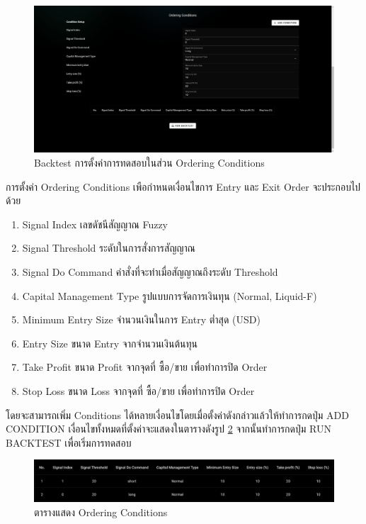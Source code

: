 \begin{figure}[ht]
    \centering
    \includegraphics[width=\textwidth]{images/web-tuts/backtest-setup-order-conds.PNG}
    \caption{Backtest การตั้งค่าการทดสอบในส่วน Ordering Conditions}
    \label{fig:backtest-setup-order-conds}
\end{figure}
\FloatBarrier
การตั้งค่า Ordering Conditions เพือกำหนดเงื่อนไขการ Entry และ Exit Order จะประกอบไปด้วย
\begin{enumerate}
    \overfullrule=0pt
    \item Signal Index เลขดัชนีสัญญาณ Fuzzy
    \item Signal Threshold ระดับในการสั่งการสัญญาณ
    \item Signal Do Command คำสั่งที่จะทำเมื่อสัญญาณถึงระดับ Threshold
    \item Capital Management Type รูปแบบการจัดการเงินทุน (Normal, Liquid-F)
    \item Minimum Entry Size จำนวนเงินในการ Entry ต่ำสุด (USD)
    \item Entry Size ขนาด Entry จากจำนวนเงินต้นทุน
    \item Take Profit ขนาด Profit จากจุดที่ ซื้อ/ขาย เพื่อทำการปิด Order
    \item Stop Loss ขนาด Loss จากจุดที่ ซื้อ/ขาย เพื่อทำการปิด Order
\end{enumerate}
โดยจะสามารถเพิ่ม Conditions ได้หลายเงื่อนไขโดยเมื่อตั้งค่าดังกล่าวแล้วให้ทำการกดปุ่ม ADD CONDITION เงื่อนไขทั้งหมดที่ตั้งค่าจะแสดงในตารางดังรูป \ref{fig:backtest-setup-conditioned} จากนั้นทำการกดปุ่ม RUN BACKTEST เพื่อเริ่มการทดสอบ
\begin{figure}[ht]
    \centering
    \includegraphics[width=\textwidth]{images/web-tuts/backtest-setup-conditioned.PNG}
    \caption{ตารางแสดง Ordering Conditions}
    \label{fig:backtest-setup-conditioned}
\end{figure}
